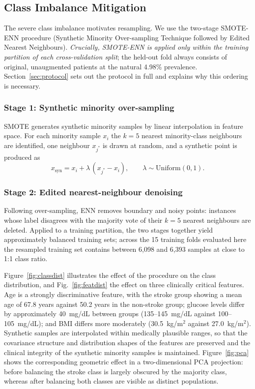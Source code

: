 \documentclass{ws-ijqi}
\begin{document}
\subsection{Class Imbalance Mitigation}
\label{sec:smote}

The severe class imbalance motivates resampling. We use the two-stage SMOTE-ENN
procedure (Synthetic Minority Over-sampling Technique followed by Edited
Nearest Neighbours). \emph{Crucially, SMOTE-ENN is applied only within the
training partition of each cross-validation split}; the held-out fold always
consists of original, unaugmented patients at the natural 4.98\% prevalence.
Section~\ref{sec:protocol} sets out the protocol in full and explains why this
ordering is necessary.

\subsubsection{Stage 1: Synthetic minority over-sampling}
SMOTE generates synthetic minority samples by linear interpolation in feature
space. For each minority sample $x_i$ the $k=5$ nearest minority-class
neighbours are identified, one neighbour $x_{j^*}$ is drawn at random, and a
synthetic point is produced as
\begin{equation}
x_{\mathrm{syn}} = x_i + \lambda\,(x_{j^*}-x_i), \qquad
\lambda \sim \mathrm{Uniform}(0,1).
\label{eq:smote}
\end{equation}

\subsubsection{Stage 2: Edited nearest-neighbour denoising}
Following over-sampling, ENN removes boundary and noisy points: instances whose
label disagrees with the majority vote of their $k=5$ nearest neighbours are
deleted. Applied to a training partition, the two stages together yield
approximately balanced training sets; across the 15 training folds evaluated
here the resampled training set contains between 6,098 and 6,393 samples at
close to 1:1 class ratio.

Figure~\ref{fig:classdist} illustrates the effect of the procedure on the class
distribution, and Fig.~\ref{fig:featdist} the effect on three clinically
critical features. Age is a strongly discriminative feature, with the stroke
group showing a mean age of 67.8 years against 50.2 years in the non-stroke
group; glucose levels differ by approximately 40~mg/dL between groups
(135--145~mg/dL against 100--105~mg/dL); and BMI differs more moderately
(30.5~kg/m$^2$ against 27.0~kg/m$^2$). Synthetic samples are interpolated
within medically plausible ranges, so that the covariance structure and
distribution shapes of the features are preserved and the clinical integrity of
the synthetic minority samples is maintained. Figure~\ref{fig:pca} shows the
corresponding geometric effect in a two-dimensional PCA projection: before
balancing the stroke class is largely obscured by the majority class, whereas
after balancing both classes are visible as distinct populations.
\end{document}
